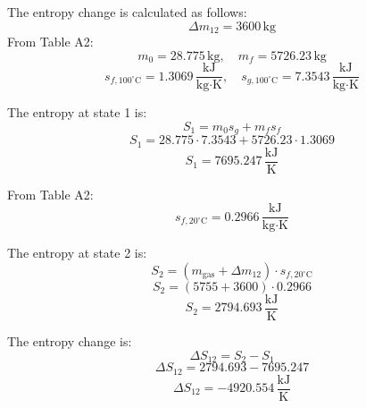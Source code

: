 The entropy change is calculated as follows:  
\[
\Delta m_{12} = 3600 \, \text{kg}
\]  
From Table A2:  
\[
m_0 = 28.775 \, \text{kg}, \quad m_f = 5726.23 \, \text{kg}
\]  
\[
s_{f,100^\circ\text{C}} = 1.3069 \, \frac{\text{kJ}}{\text{kg·K}}, \quad s_{g,100^\circ\text{C}} = 7.3543 \, \frac{\text{kJ}}{\text{kg·K}}
\]  

The entropy at state 1 is:  
\[
S_1 = m_0 s_g + m_f s_f
\]  
\[
S_1 = 28.775 \cdot 7.3543 + 5726.23 \cdot 1.3069
\]  
\[
S_1 = 7695.247 \, \frac{\text{kJ}}{\text{K}}
\]  

From Table A2:  
\[
s_{f,20^\circ\text{C}} = 0.2966 \, \frac{\text{kJ}}{\text{kg·K}}
\]  

The entropy at state 2 is:  
\[
S_2 = (m_{\text{gas}} + \Delta m_{12}) \cdot s_{f,20^\circ\text{C}}
\]  
\[
S_2 = (5755 + 3600) \cdot 0.2966
\]  
\[
S_2 = 2794.693 \, \frac{\text{kJ}}{\text{K}}
\]  

The entropy change is:  
\[
\Delta S_{12} = S_2 - S_1
\]  
\[
\Delta S_{12} = 2794.693 - 7695.247
\]  
\[
\Delta S_{12} = -4920.554 \, \frac{\text{kJ}}{\text{K}}
\]